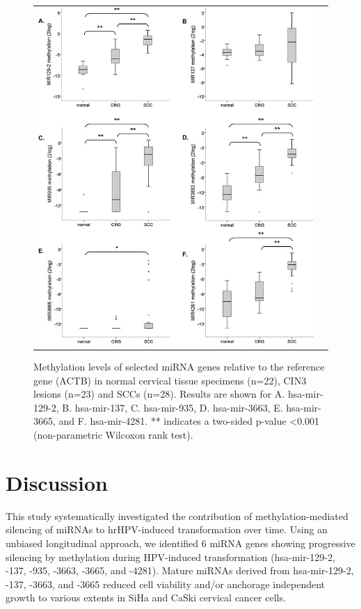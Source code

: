 \begin{figure}[h!]
\centering
\begin{tabular}{cc} 
\includegraphics[scale=2.5]{Figure6.jpg}
\end{tabular}
\caption{Methylation levels of selected miRNA genes relative to the reference gene (ACTB) in normal cervical tissue specimens (n=22), CIN3 lesions (n=23) and SCCs (n=28).  Results are shown for A. hsa-mir-129-2, B. hsa-mir-137, C. hsa-mir-935, D. hsa-mir-3663, E. hsa-mir-3665, and F. hsa-mir-4281. ** indicates a two-sided p-value <0.001 (non-parametric Wilcoxon rank test).}
\label{fig:figure6}
\end{figure}

\section{Discussion}

This study systematically investigated the contribution of methylation-mediated silencing of miRNAs to hrHPV-induced transformation over time. Using an unbiased longitudinal approach, we identified 6 miRNA genes showing progressive silencing by methylation during HPV-induced transformation (hsa-mir-129-2, -137, -935, -3663, -3665, and -4281). Mature miRNAs derived from hsa-mir-129-2, -137, -3663, and -3665 reduced cell viability and/or anchorage independent growth to various extents in SiHa and CaSki cervical cancer cells. 

